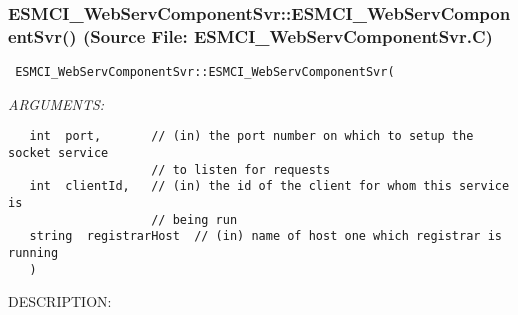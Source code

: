  
\setlength{\oldparskip}{\parskip}
\setlength{\parskip}{1.5ex}
\setlength{\oldparindent}{\parindent}
\setlength{\parindent}{0pt}
\setlength{\oldbaselineskip}{\baselineskip}
\setlength{\baselineskip}{11pt}
 
\def\bv{\begin{verbatim}}
\def\ev{\end{verbatim}}
\def\be{\begin{equation}}
\def\ee{\end{equation}}
\def\bea{\begin{eqnarray}}
\def\eea{\end{eqnarray}}
\def\bi{\begin{itemize}}
\def\ei{\end{itemize}}
\def\bn{\begin{enumerate}}
\def\en{\end{enumerate}}
\def\bd{\begin{description}}
\def\ed{\end{description}}
\def\({\left (}
\def\){\right )}
\def\[{\left [}
\def\]{\right ]}
\def\<{\left  \langle}
\def\>{\right \rangle}
\def\cI{{\cal I}}
\def\diag{\mathop{\rm diag}}
\def\tr{\mathop{\rm tr}}


 
\subsubsection{ESMCI\_WebServComponentSvr::ESMCI\_WebServComponentSvr() (Source File: ESMCI\_WebServComponentSvr.C)}


  
\begin{verbatim} ESMCI_WebServComponentSvr::ESMCI_WebServComponentSvr(\end{verbatim}{\em ARGUMENTS:}
\begin{verbatim}   int  port,       // (in) the port number on which to setup the socket service
                    // to listen for requests
   int  clientId,   // (in) the id of the client for whom this service is
                    // being run
   string  registrarHost  // (in) name of host one which registrar is running
   )\end{verbatim}
{\sf DESCRIPTION:\\ }


